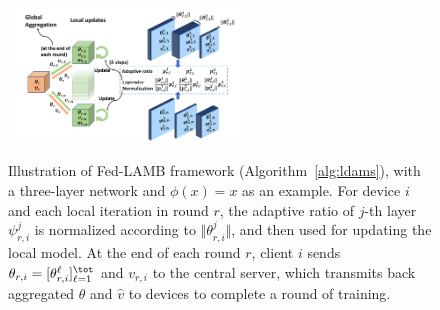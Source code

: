 \documentclass[nohyperref]{article}
\theoremstyle{plain}
\theoremstyle{definition}
\theoremstyle{remark}
\begin{document}

\begin{figure}[h]
\mbox{\hspace{-0.15in}
        \includegraphics[width=0.53\textwidth]{new_figure/plot1.pdf}
}

	\caption{Illustration of Fed-LAMB framework (Algorithm~\ref{alg:ldams}), with a three-layer network and $\phi(x)=x$ as an example. %
		For device $i$ and each local iteration in round $r$, the adaptive ratio of $j$-th layer $\psi_{r,i}^j$ is normalized according to $\Vert \theta_{r,i}^j\Vert$, and then used for updating the local model. 
	At the end of each round $r$, client $i$ sends $\theta_{r,i} =  [\theta_{r,i}^{\ell}]_{\ell =1}^{\tot}$ and $v_{r,i}$ to the central server, which transmits back aggregated $\theta$ and $\hat v$ to devices to complete a round of training.}
	\label{fig:illustrate}
\end{figure}
\end{document}
